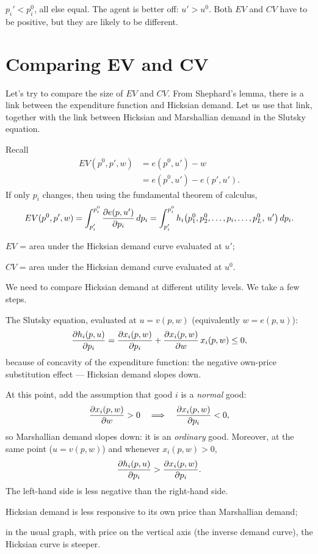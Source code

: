 \documentclass[11pt]{article}
\begin{document}
 $p_i'<p_i^0$, all else equal. The agent is better off: $u'>u^0$.
Both $EV$ and $CV$ have to be positive, but they are likely to be different.


\section{Comparing EV and CV}

Let's try to compare the size of $EV$ and $CV$. From Shephard's lemma, there is a
link between the expenditure function and Hicksian demand. Let us use that link,
together with the link between Hicksian and Marshallian demand in the Slutsky
equation.

Recall
\begin{align*}
  EV(p^0,p',w)&=e(p^0,u')-w\\
              &=e(p^0,u')-e(p',u').
\end{align*}
If only $p_i$ changes, then using the fundamental theorem of calculus,
\[ EV(p^0,p',w)=\int_{p_i'}^{p_i^0}\frac{\partial e(p,u')}{\partial p_i}\,dp_i
   =\int_{p_i'}^{p_i^0}h_i\bigl(p_1^0,p_2^0,\dots,p_i,\dots,p_L^0,\,u'\bigr)\,dp_i . \]
\begin{flatlist}
  \item[$\Rightarrow$] $EV$ = area under the Hicksian demand curve evaluated at $u'$;
  \item[] $CV$ = area under the Hicksian demand curve evaluated at $u^0$.
\end{flatlist}

We need to compare Hicksian demand at different utility levels. We take a few steps.

The Slutsky equation, evaluated at $u=v(p,w)$ (equivalently $w=e(p,u)$):
\[ \frac{\partial h_i(p,u)}{\partial p_i}=\frac{\partial x_i(p,w)}{\partial p_i}+\frac{\partial x_i(p,w)}{\partial w}\,x_i(p,w)\le 0 , \]
because of concavity of the expenditure function: the negative own-price substitution
effect --- Hicksian demand slopes down.

At this point, add the assumption that good $i$ is a \emph{normal} good:
\[ \frac{\partial x_i(p,w)}{\partial w}>0
   \quad\Longrightarrow\quad \frac{\partial x_i(p,w)}{\partial p_i}<0 , \]
so Marshallian demand slopes down: it is an \emph{ordinary} good. Moreover, at the same point
($u=v(p,w)$) and whenever $x_i(p,w)>0$,
\[ \frac{\partial h_i(p,u)}{\partial p_i}>\frac{\partial x_i(p,w)}{\partial p_i}. \]
The left-hand side is less negative than the right-hand side.
\begin{flatlist}
  \item[$\Rightarrow$] Hicksian demand is less responsive to its own price than
        Marshallian demand;
  \item[$\Rightarrow$] in the usual graph, with price on the vertical axis (the inverse
        demand curve), the Hicksian curve is steeper.
\end{flatlist}
\end{document}
